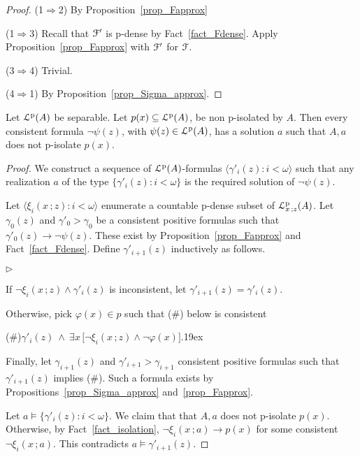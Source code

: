 \documentclass[10pt,oneside]{amsproc}
\newcommand{\mylabel}[1]{{#1}\hfill}
\renewenvironment{itemize}
  {\begin{list}{$\triangleright$}{%
  \setlength{\parskip}{0mm}
  \setlength{\topsep}{.4\baselineskip}
  \setlength{\rightmargin}{0mm}
  \setlength{\listparindent}{0mm}
  \setlength{\itemindent}{0mm}
  \setlength{\labelwidth}{3ex}
  \setlength{\itemsep}{.2\baselineskip}
  \setlength{\parsep}{.2\baselineskip}
  \setlength{\partopsep}{0mm}
  \setlength{\labelsep}{1ex}
  \setlength{\leftmargin}{\labelwidth+\labelsep}
  \let\makelabel\mylabel}}{%
\end{list}}
\begin{document}
{\begin{proof}
  (1$\Rightarrow$2) By Proposition~\ref{prop_Fapprox}
  
  (1$\Rightarrow$3) Recall that ${\EuScript F}'$ is p-dense by Fact~\ref{fact_Fdense}.
  Apply Proposition~\ref{prop_Fapprox} with ${\EuScript F}'$ for ${\EuScript F}$.

  (3$\Rightarrow$4) Trivial.

  (4$\Rightarrow$1) By Proposition~\ref{prop_Sigma_approx}.
\end{proof}


\begin{lemma}\label{lem_kuratowskiUlam}
  Let ${\EuScript L}^{\rm p}(A)$ be separable.
  Let $p(x)\subseteq{\EuScript L}^{\rm p}(A)$, be non p-isolated by $A$.
  Then every consistent formula $\neg\psi(z)$, with $\psi(z)\in{\EuScript L}^{\rm p}(A)$, has a solution $a$ such that $A,a$ does not p-isolate $p(x)$.
  \end{lemma}
  \begin{proof}
  We construct a sequence of ${\EuScript L}^{\rm p}(A)$-formulas $\langle\gamma'_i(z):i<\omega\rangle$ such that any realization $a$ of the type $\big\{\gamma'_i(z):i<\omega\big\}$ is the required solution of $\neg\psi(z)$.
  
  Let $\langle\xi_i(x\,;z):i<\omega\rangle$ enumerate a countable p-dense subset of ${\EuScript L}^{\rm p}_{x\,;z}(A)$.
  Let $\gamma_0(z)$ and $\gamma'_0>\gamma_0$ be a consistent positive formulas such that $\gamma'_0(z)\rightarrow\neg\psi(z)$.
  These exist by Proposition~\ref{prop_Fapprox} and Fact~\ref{fact_Fdense}.
  Define $\gamma'_{i+1}(z)$ inductively as follows.
  
  \begin{itemize}
     \item[1.] If $\neg\xi_i(x\,;z)\wedge\gamma'_i(z)$ is inconsistent, let  $\gamma'_{i+1}(z)=\gamma'_i(z)$.
     \item[2.] Otherwise, pick $\varphi(x)\in p$ such that (\#) below is consistent
     
     (\#)\hfil$\gamma'_i(z)\ \wedge\ \exists x\,\big[\neg\xi_i(x\,;z)\wedge\neg\varphi(x)\big].$\kern19ex
     
     Finally, let $\gamma_{i+1}(z)$ and $\gamma'_{i+1}>\gamma_{i+1}$ consistent positive formulas such that $\gamma'_{i+1}(z)$ implies (\#).
     Such a formula exists by Propositions~\ref{prop_Sigma_approx} and~\ref{prop_Fapprox}.
  \end{itemize}
  Let $a\models\{\gamma'_i(z):i<\omega\}$.
  We claim that that $A,a$ does not p-isolate $p(x)$.
  Otherwise, by Fact~\ref{fact_isolation}, $\neg\xi_i(x\,;a)\rightarrow p(x)$ for some consistent $\neg\xi_i(x\,;a)$.
  This contradicts $a\models\gamma'_{i+1}(z)$.
  

\end{proof}}
\end{document}
